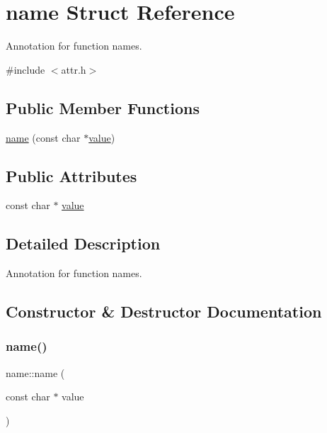 \hypertarget{structname}{}\section{name Struct Reference}
\label{structname}


Annotation for function names.  




{\ttfamily \#include $<$attr.\+h$>$}

\subsection*{Public Member Functions}
\begin{DoxyCompactItemize}
\item 
\mbox{\hyperlink{structname_ac4fea0d283ba29072b06f830fba403d2}{name}} (const char $\ast$\mbox{\hyperlink{_s_d_l__opengl__glext_8h_a8ad81492d410ff2ac11f754f4042150f}{value}})
\end{DoxyCompactItemize}
\subsection*{Public Attributes}
\begin{DoxyCompactItemize}
\item 
const char $\ast$ \mbox{\hyperlink{structname_a86a1d2e431af94bee2c79e1d102eb4c7}{value}}
\end{DoxyCompactItemize}


\subsection{Detailed Description}
Annotation for function names. 

\subsection{Constructor \& Destructor Documentation}
\mbox{\label{structname_ac4fea0d283ba29072b06f830fba403d2}} 
\subsubsection{\texorpdfstring{name()}{name()}}
{\footnotesize\ttfamily name\+::name (\begin{DoxyParamCaption}\item[{const char $\ast$}]{value }\end{DoxyParamCaption})\hspace{0.3cm}{\ttfamily [inline]}}



